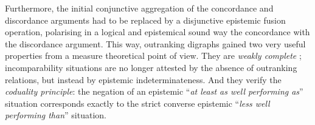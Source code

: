 Furthermore, the initial conjunctive aggregation of the concordance and discordance arguments had to be replaced by a disjunctive epistemic fusion operation, polarising in a logical and epistemical sound way the concordance with the discordance argument. This way, outranking  digraphs gained two very useful properties from a measure theoretical point of view. They are \emph{weakly complete} ; incomparability situations are no longer attested by the absence of outranking relations, but instead by epistemic indeterminateness. And they verify the \emph{coduality principle}: the negation of an epistemic ``\emph{at least as well performing as}'' situation corresponds exactly to the strict converse epistemic ``\emph{less well performing than}'' situation.


\clearpage


%